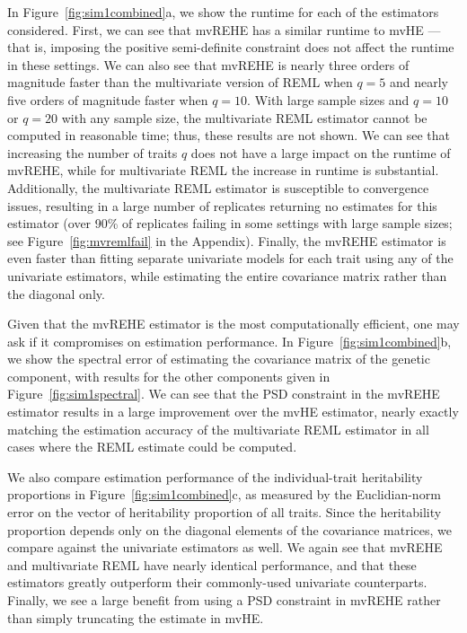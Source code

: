 \documentclass[12pt]{article}
\begin{document}
In Figure~\ref{fig:sim1combined}a, we show the runtime for each of the estimators considered. First, we can see that mvREHE has a similar runtime to mvHE --- that is, imposing the positive semi-definite constraint does not affect the runtime in these settings. We can also see that mvREHE is nearly three orders of magnitude faster than the multivariate version of REML when $q = 5$ and nearly five orders of magnitude faster when $q = 10$. With large sample sizes and $q = 10$ or $q = 20$ with any sample size, the multivariate REML estimator cannot be computed in reasonable time; thus, these results are not shown. We can see that increasing the number of traits $q$ does not have a large impact on the runtime of mvREHE, while for multivariate REML the increase in runtime is substantial. Additionally, the multivariate REML estimator is susceptible to convergence issues, resulting in a large number of replicates returning no estimates for this estimator (over 90\% of replicates failing in some settings with large sample sizes; see Figure~\ref{fig:mvremlfail} in the Appendix). Finally, the mvREHE estimator is even faster than fitting separate univariate models for each trait using any of the univariate estimators, while estimating the entire covariance matrix rather than the diagonal only.


Given that the mvREHE estimator is the most computationally efficient, one may ask if it compromises on estimation performance. In Figure~\ref{fig:sim1combined}b, we show the spectral error of estimating the covariance matrix of the genetic component, with results for the other components given in Figure~\ref{fig:sim1spectral}. We can see that the PSD constraint in the mvREHE estimator results in a large improvement over the mvHE estimator, nearly exactly matching the estimation accuracy of the multivariate REML estimator in all cases where the REML estimate could be computed. 

We also compare estimation performance of the individual-trait heritability proportions in Figure~\ref{fig:sim1combined}c, as measured by the Euclidian-norm error on the vector of heritability proportion of all traits. Since the heritability proportion depends only on the diagonal elements of the covariance matrices, we compare against the univariate estimators as well. We again see that mvREHE and multivariate REML have nearly identical performance, and that these estimators greatly outperform their commonly-used univariate counterparts. Finally, we see a large benefit from using a PSD constraint in mvREHE rather than simply truncating the estimate in mvHE. 
\end{document}
